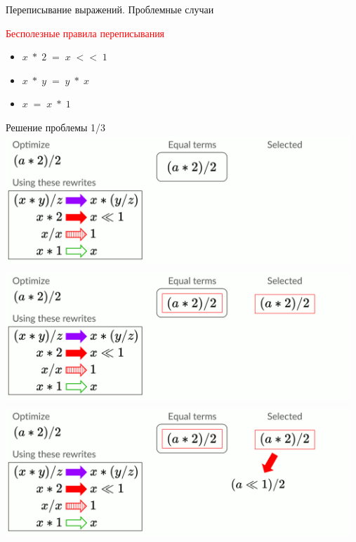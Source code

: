 \documentclass[aspectratio=169
  , xcolor={svgnames}
  , russian  %
  ]{beamer}
\begin{document}
\begin{frame}{Переписывание выражений. Проблемные случаи}
{    \vspace{1cm} %
    
    {\fontsize{15.1}{12}\selectfont \textcolor{red}{Бесполезные правила переписывания}}
    {\fontsize{16.1}{12}\selectfont %
    \begin{itemize}
    \item $x\; * \;2 \; = \;  x \; << \; 1$
    \item $x \;*\; y \;= \;y \;* \;x$
    \item $x \;= \;x \;* \;1$ 
    \end{itemize}
    }
}
\end{frame}

\begin{frame}{Решение проблемы 1/3}
    {
        \centering
        \includegraphics[width=13cm, height=5cm]{misc/egraphs_images/naive/n-0.jpg}
   } 
    {
        \centering
        \includegraphics[width=13cm, height=5cm]{misc/egraphs_images//naive/n-1.jpg}
   } 
    {
        \centering
        \includegraphics[width=13cm, height=5cm]{misc/egraphs_images/naive/n-2.jpg}
}
\end{frame}
\end{document}
